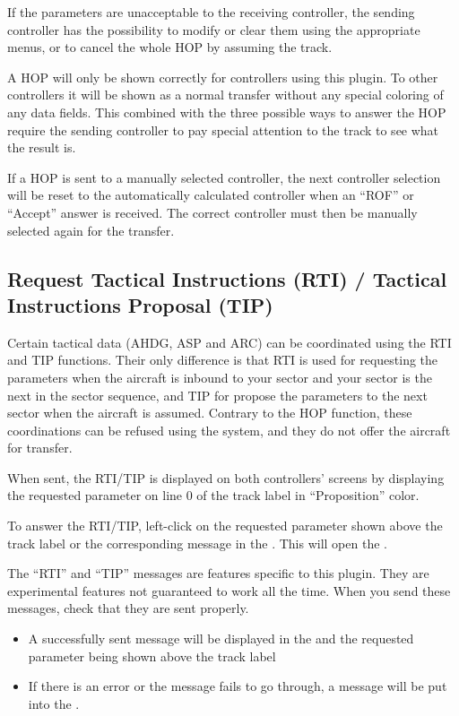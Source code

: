 \documentclass[11pt,a4paper,oldfontcommands]{memoir}
\newenvironment{Warn}
  {\begin{shaded}\marginnote{\fbox{Warning}}}
  {\end{shaded}}
\begin{document}
If the parameters are unacceptable to the receiving controller, the sending controller has the possibility to
modify or clear them using the appropriate menus, or to cancel the whole HOP by assuming the track.

\begin{Warn}
A HOP will only be shown correctly for controllers using this plugin. To other controllers it will be shown as a normal transfer without any special coloring of any data fields. This combined with the three possible ways to answer the HOP require the sending controller to pay special attention to the track to see what the result is.   
\end{Warn}

\begin{Warn}
If a HOP is sent to a manually selected controller, the next controller selection will be reset to the automatically calculated controller when an “ROF” or “Accept” answer is received. The correct controller must then be manually selected again for the transfer.   
\end{Warn}

\subsection{Request Tactical Instructions (RTI) / Tactical Instructions Proposal (TIP)}
\label{win:rti}
\label{win:tip}
Certain tactical data (AHDG, ASP and ARC) can be coordinated using the RTI and TIP functions. Their only difference is that RTI is used for requesting the parameters when the aircraft is inbound to your sector and your sector is the next in the sector sequence, and TIP for propose the parameters to the next sector when the aircraft is assumed. Contrary to the HOP function, these coordinations can be refused using the system, and they do not offer the aircraft for transfer.

When sent, the RTI/TIP is displayed on both controllers’ screens by displaying the requested parameter on line 0 of the track label in “Proposition” color.

To answer the RTI/TIP, left-click on the requested parameter shown above the track label or the corresponding message in the \textit{}. This will open the \textit{}.

\begin{Warn}
The “RTI” and “TIP” messages are features specific to this plugin. They are experimental features not guaranteed to work all the time. When you send these messages, check that they are sent properly.

\begin{itemize}
        \item A successfully sent message will be displayed in the \textit{} and the requested parameter being shown above the track label
        \item If there is an error or the message fails to go through, a message will be put into the \textit{}.
\end{itemize}
\end{Warn}
\end{document}
